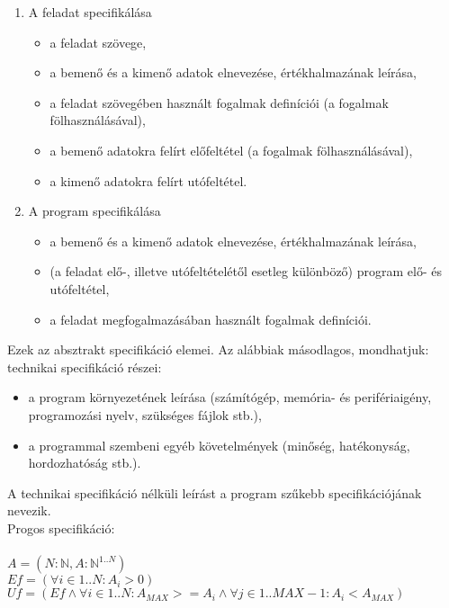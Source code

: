 \documentclass[margin=0px]{article}
\begin{document}
\begin{enumerate}
    \item A feladat specifikálása
          \begin{itemize}
              \item a feladat szövege,
              \item a bemenő és a kimenő adatok elnevezése, értékhalmazának leírása,
              \item a feladat szövegében használt fogalmak definíciói (a fogalmak fölhasználásával),
              \item a bemenő adatokra felírt előfeltétel (a fogalmak fölhasználásával),
              \item a kimenő adatokra felírt utófeltétel.
          \end{itemize}
    \item A program specifikálása
          \begin{itemize}
              \item a bemenő és a kimenő adatok elnevezése, értékhalmazának leírása,
              \item (a feladat elő-, illetve utófeltételétől esetleg különböző) program elő- és utófeltétel,
              \item a feladat megfogalmazásában használt fogalmak definíciói.
          \end{itemize}
\end{enumerate}

\noindent Ezek az absztrakt specifikáció elemei. Az alábbiak másodlagos, mondhatjuk: technikai specifikáció részei:

\begin{itemize}
    \item a program környezetének leírása (számítógép, memória- és perifériaigény, programozási nyelv, szükséges fájlok stb.),
    \item a programmal szembeni egyéb követelmények (minőség, hatékonyság, hordozhatóság stb.).
\end{itemize}

\noindent A technikai specifikáció nélküli leírást a program szűkebb specifikációjának nevezik.\\

\noindent Progos specifikáció:\\\\
$A=(N : \mathbb{N}, A: \mathbb{N}^{1..N})$\\
$Ef=(\forall i \in {1..N} : A_{i}>0)$\\
$Uf=(Ef \land \forall i \in {1..N} : A_{MAX}>=A_{i} \land \forall j \in {1..MAX-1} : A_{i}<A_{MAX})$
\end{document}

